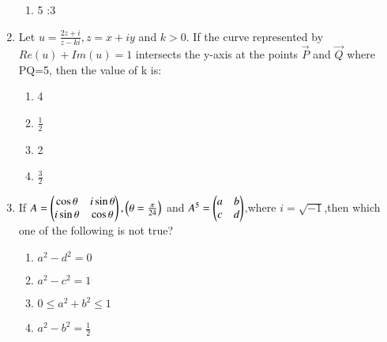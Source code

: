 \documentclass[journal,12pt,twocolumn]{IEEEtran}
\theoremstyle{remark}
\begin{document}
\begin{enumerate}
\begin{enumerate}
    \item 5 :3
\end{enumerate}
\item Let $u=\frac{2z+i}{z-ki},z=x+iy$ and $k>0$. If the curve represented by $Re(u)+Im(u)=1$ intersects the y-axis at the points $\vec{P}$ and $\vec{Q}$ where PQ=5, then the value of k is:
\begin{enumerate}
    \item 4
    \item $\frac{1}{2}$
    \item 2
    \item $\frac{3}{2}$
\end{enumerate}
\item If $A=\begin{pmatrix}\cos\theta&i\sin\theta\\i\sin\theta&\cos\theta\end{pmatrix},\left(\theta=\frac{\pi}{24}\right)$ and $A^5=\begin{pmatrix}a&b\\c&d\end{pmatrix}$,where $i=\sqrt{-1}$,then which one of the following is not true?
\begin{enumerate}
    \item $a^2-d^2=0$
    \item $a^2-c^2=1$
    \item $0\leq a^2+b^2\leq1$
    \item $a^2-b^2=\frac{1}{2}$
\end{enumerate}

\end{enumerate}
\end{document}
